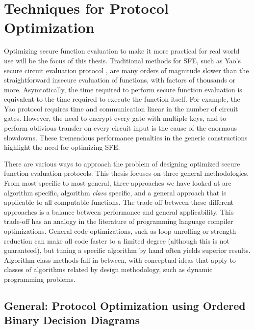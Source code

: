 
\chapter{Techniques for Protocol Optimization}\label{sec:Techniques}

Optimizing secure function evaluation to make it more practical for
real world use will be the focus of this thesis.  Traditional methods
for SFE, such as Yao's secure circuit evaluation protocol \cite{Yao86},
are many orders of magnitude slower than the straightforward insecure evaluation of
functions, with factors of thousands or more.  Asymtotically, the time
required to perform secure function evaluation
is equivalent to the time required to execute the function itself.
For example, the Yao protocol
requires time and communication linear in the number of circuit gates.
However, the need to encrypt every gate with multiple keys, and to
perform oblivious transfer on every circuit input is the cause of the enormous
slowdowns.  These tremendous performance penalties in the generic constructions highlight
the need for optimizing SFE.

There are various ways to approach the problem of designing optimized
secure function evaluation protocols.  This thesis focuses
on three general methodologies. From most specific to most general,
three approaches we have looked at are algorithm specific, algorithm
\emph{class} specific, and a general approach that is applicable to
all computable functions. The trade-off between these different approaches
is a balance between performance and general applicability. This trade-off
has an analogy in the literature of programming language compiler
optimizations. General code optimizations, such as loop-unrolling
or strength-reduction can make all code faster to a limited degree
(although this is not guaranteed), but tuning a specific algorithm
by hand often yields superior results. Algorithm class methods fall
in between, with conceptual ideas that apply to classes of algorithms
related by design methodology, such as dynamic programming problems.


\section{General: Protocol Optimization using Ordered Binary Decision Diagrams}
\label{OBDD-section}

